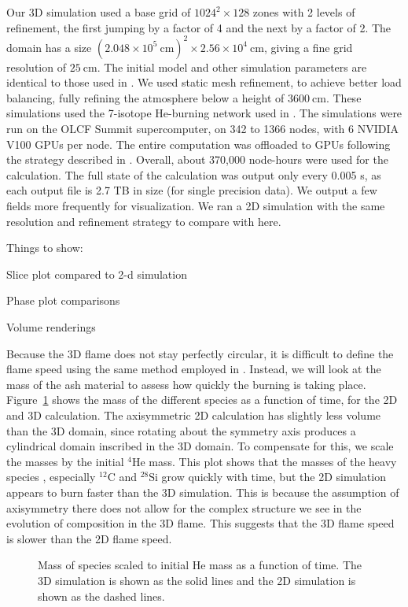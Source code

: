 \documentclass[preprint,times,tighten]{aastex631}
\newcommand{\isot}[2]{$^{#2}\mathrm{#1}$}
\begin{document}
Our 3D simulation used a base grid of $1024^2 \times 128$ zones with 2
levels of refinement, the first jumping by a factor of 4 and the next
by a factor of 2.  The domain has a size $(2.048\times
10^5~\mathrm{cm})^2 \times 2.56\times 10^4~\mathrm{cm}$, giving a fine
grid resolution of $25~\mathrm{cm}$.  The initial model and other
simulation parameters are identical to those used in
\citet{harpole:2021}.  We used static mesh refinement, to achieve
better load balancing, fully refining the atmosphere below a height of
$3600~\mathrm{cm}$.  These simulations used the 7-isotope He-burning
network used in \citet{eiden:2020}.  The simulations were run on the
OLCF Summit supercomputer, on 342 to 1366 nodes, with 6 NVIDIA V100
GPUs per node.  The entire computation was offloaded to GPUs following
the strategy described in \citet{castro_gpu}.  Overall, about 370,000
node-hours were used for the calculation.  The full state of the
calculation was output only every 0.005 s, as each output file is 2.7 TB
in size (for single precision data).  We output a few fields more
frequently for visualization.  We ran a 2D simulation with the same
resolution and refinement strategy to compare with here.

Things to show:

Slice plot compared to 2-d simulation

Phase plot comparisons

Volume renderings

Because the 3D flame does not stay perfectly circular, it is difficult
to define the flame speed using the same method employed in
\citet{eiden:2020}.  Instead, we will look at the mass of the ash
material to assess how quickly the burning is taking place.
Figure~\ref{fig:mass_plot} shows the mass of the different species as
a function of time, for the 2D and 3D calculation.  The axisymmetric
2D calculation has slightly less volume than the 3D domain, since
rotating about the symmetry axis produces a cylindrical domain
inscribed in the 3D domain.  To compensate for this, we scale the
masses by the initial \isot{He}{4} mass.  This plot shows that the
masses of the heavy species , especially \isot{C}{12} and
\isot{Si}{28} grow quickly with time, but the 2D simulation appears to
burn faster than the 3D simulation.  This is because the assumption of
axisymmetry there does not allow for the complex structure we see in
the evolution of composition in the 3D flame.  This suggests that the
3D flame speed is slower than the 2D flame speed.

\begin{figure}[t]
\centering
{}
\caption{\label{fig:mass_plot} Mass of species scaled to initial He mass as a function of time.  The 3D simulation is shown as the solid lines and the 2D simulation is shown as the dashed lines.}
\end{figure}
\end{document}
